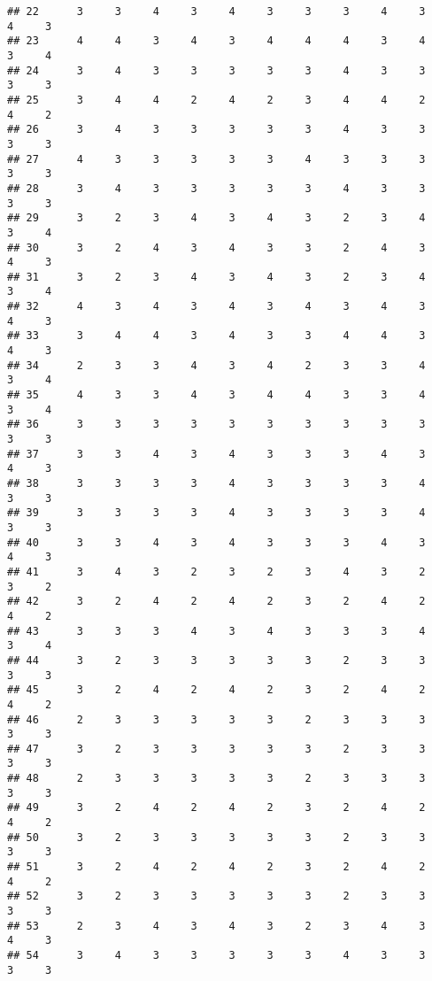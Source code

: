 \documentclass[
]{article}
\begin{document}
\begin{verbatim}
## 22      3     3     4     3     4     3     3     3     4     3     4     3
## 23      4     4     3     4     3     4     4     4     3     4     3     4
## 24      3     4     3     3     3     3     3     4     3     3     3     3
## 25      3     4     4     2     4     2     3     4     4     2     4     2
## 26      3     4     3     3     3     3     3     4     3     3     3     3
## 27      4     3     3     3     3     3     4     3     3     3     3     3
## 28      3     4     3     3     3     3     3     4     3     3     3     3
## 29      3     2     3     4     3     4     3     2     3     4     3     4
## 30      3     2     4     3     4     3     3     2     4     3     4     3
## 31      3     2     3     4     3     4     3     2     3     4     3     4
## 32      4     3     4     3     4     3     4     3     4     3     4     3
## 33      3     4     4     3     4     3     3     4     4     3     4     3
## 34      2     3     3     4     3     4     2     3     3     4     3     4
## 35      4     3     3     4     3     4     4     3     3     4     3     4
## 36      3     3     3     3     3     3     3     3     3     3     3     3
## 37      3     3     4     3     4     3     3     3     4     3     4     3
## 38      3     3     3     3     4     3     3     3     3     4     3     3
## 39      3     3     3     3     4     3     3     3     3     4     3     3
## 40      3     3     4     3     4     3     3     3     4     3     4     3
## 41      3     4     3     2     3     2     3     4     3     2     3     2
## 42      3     2     4     2     4     2     3     2     4     2     4     2
## 43      3     3     3     4     3     4     3     3     3     4     3     4
## 44      3     2     3     3     3     3     3     2     3     3     3     3
## 45      3     2     4     2     4     2     3     2     4     2     4     2
## 46      2     3     3     3     3     3     2     3     3     3     3     3
## 47      3     2     3     3     3     3     3     2     3     3     3     3
## 48      2     3     3     3     3     3     2     3     3     3     3     3
## 49      3     2     4     2     4     2     3     2     4     2     4     2
## 50      3     2     3     3     3     3     3     2     3     3     3     3
## 51      3     2     4     2     4     2     3     2     4     2     4     2
## 52      3     2     3     3     3     3     3     2     3     3     3     3
## 53      2     3     4     3     4     3     2     3     4     3     4     3
## 54      3     4     3     3     3     3     3     4     3     3     3     3

\end{verbatim}
\end{document}
